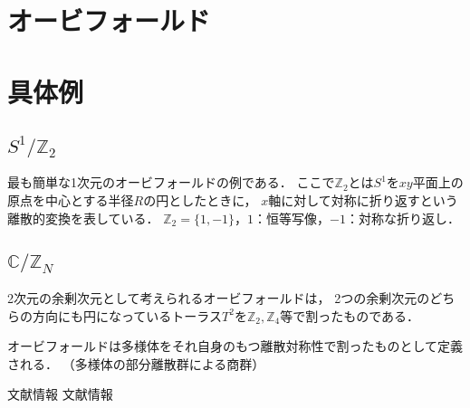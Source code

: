 \documentclass[uplatex]{jsarticle}
\numberwithin{theorem}{section}
\newcommand{\Cbb}{\mathbb{C}}
\newcommand{\Zbb}{\mathbb{Z}}
\begin{document}
\section{オービフォールド}

\section{具体例}

\subsection{\texorpdfstring{$S^1/\Zbb_2$}{S1/Z2}}
最も簡単な1次元のオービフォールドの例である．
ここで$\Zbb_2$とは$S^1$を$xy$平面上の原点を中心とする半径$R$の円としたときに，
$x$軸に対して対称に折り返すという離散的変換を表している．
$\Zbb_2 = \{ 1, -1\}$，$1$：恒等写像，$-1$：対称な折り返し．

\subsection{\texorpdfstring{$\Cbb/\Zbb_N$}{C/ZN}}

2次元の余剰次元として考えられるオービフォールドは，
2つの余剰次元のどちらの方向にも円になっているトーラス$T^2$を$\Zbb_2, \Zbb_4$等で割ったものである．

オービフォールドは多様体をそれ自身のもつ離散対称性で割ったものとして定義される．
（多様体の部分離散群による商群）



\begin{thebibliography}{99}
 文献情報
 文献情報
\end{thebibliography}
\end{document}
